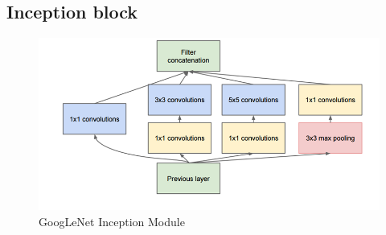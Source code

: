 \subsection{Inception block}
\begin{frame}{\insertsubsec}
    \begin{figure}[H]
        \includegraphics[width=\textwidth]{images/GoogLeNet3}
        \caption{GoogLeNet Inception Module}
    \end{figure}
\end{frame}

